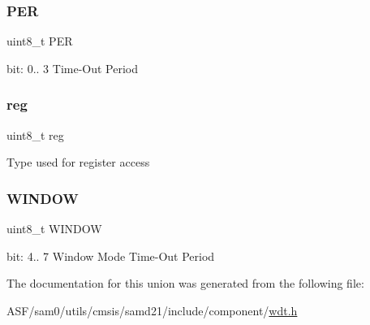 \subsubsection{\texorpdfstring{PER}{PER}}
{\footnotesize\ttfamily uint8\+\_\+t P\+ER}

bit\+: 0.. 3 Time-\/\+Out Period \mbox{\label{union_w_d_t___c_o_n_f_i_g___type_a9428adc9af4653a2050e2536b55dec8d}} 
\subsubsection{\texorpdfstring{reg}{reg}}
{\footnotesize\ttfamily uint8\+\_\+t reg}

Type used for register access \mbox{\label{union_w_d_t___c_o_n_f_i_g___type_ab1ebb59c38d77ff60d2152e0e5b8c9de}} 
\subsubsection{\texorpdfstring{WINDOW}{WINDOW}}
{\footnotesize\ttfamily uint8\+\_\+t W\+I\+N\+D\+OW}

bit\+: 4.. 7 Window Mode Time-\/\+Out Period 

The documentation for this union was generated from the following file\+:\begin{DoxyCompactItemize}
\item 
A\+S\+F/sam0/utils/cmsis/samd21/include/component/\mbox{\hyperlink{component_2wdt_8h}{wdt.\+h}}\end{DoxyCompactItemize}
